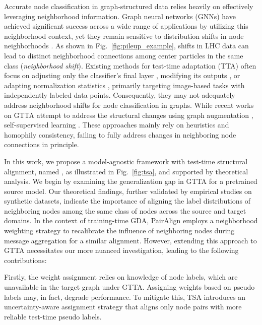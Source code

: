 Accurate node classification in graph-structured data relies heavily on effectively leveraging neighborhood information. Graph neural networks (GNNs) \cite{kipf2016semi, velivckovic2017graph, hamilton2017inductive, hamilton2020graph} have achieved significant success across a wide range of applications by utilizing this neighborhood context, yet they remain sensitive to distribution shifts in node neighborhoods \cite{gui2022good, ji2023drugood}. As shown in Fig.~\ref{fig:pileup_example}, shifts in LHC data can lead to distinct neighborhood connections among center particles in the same class (\emph{neighborhood shift}).
Existing methods for test-time adaptation (TTA) often focus on adjusting only the classifier’s final layer \cite{iwasawa2021test}, modifying its outputs \cite{boudiaf2022parameter}, or adapting normalization statistics \cite{wang2020tent, niu2023towards}, primarily targeting image-based tasks with independently labeled data points. Consequently, they may not adequately address neighborhood shifts for node classification in graphs. While recent works on GTTA attempt to address the structural changes using graph augmentation \cite{jin2022empowering}, self-supervised learning \cite{mao2024source}. 
These approaches mainly rely on heuristics and homophily consistency, failing to fully address changes in neighboring node connections in principle.


In this work, we propose a model-agnostic framework with test-time structural alignment, named \proj, as illustrated in Fig.~\ref{fig:tsa}, and supported by theoretical analysis. We begin by examining the generalization gap in GTTA for a pretrained source model. Our theoretical findings, further validated by empirical studies on synthetic datasets, indicate the importance of aligning the label distributions of neighboring nodes among the same class of nodes across the source and target domains. In the context of training-time GDA, PairAlign \cite{liu2024pairwise} employs a neighborhood weighting strategy to recalibrate the influence of neighboring nodes during message aggregation for a similar alignment. However, extending this approach to GTTA necessitates our more nuanced investigation, leading to the following contributions:


Firstly, the weight assignment relies on knowledge of node labels, which are unavailable in the target graph under GTTA. Assigning weights based on pseudo labels may, in fact, degrade performance. To mitigate this, TSA introduces an uncertainty-aware assignment strategy that aligns only node pairs with more reliable test-time pseudo labels.

